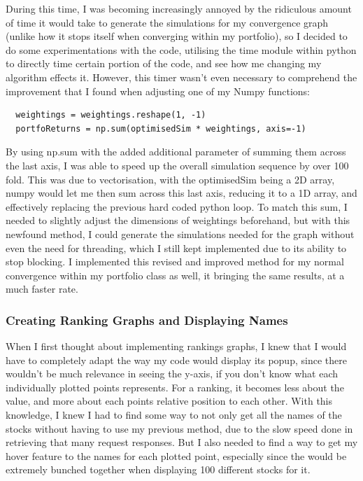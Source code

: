 \documentclass{article}
\begin{document}
During this time, I was becoming increasingly annoyed by the ridiculous amount of time it would take to generate the simulations for my convergence graph (unlike how it stops itself when converging within my portfolio), so I decided to do some experimentations with the code, utilising the time module within python to directly time certain portion of the code, and see how me changing my algorithm effects it. However, this timer wasn't even necessary to comprehend the improvement that I found when adjusting one of my Numpy functions:\\\vspace{0.3cm}

\begin{verbatim}
  weightings = weightings.reshape(1, -1)
  portfoReturns = np.sum(optimisedSim * weightings, axis=-1)
\end{verbatim}

\vspace{0.3cm}
By using np.sum with the added additional parameter of summing them across the last axis, I was able to speed up the overall simulation sequence by over 100 fold. This was due to vectorisation, with the optimisedSim being a 2D array, numpy would let me then sum across this last axis, reducing it to a 1D array, and effectively replacing the previous hard coded python loop. To match this sum, I needed to slightly adjust the dimensions of weightings beforehand, but with this newfound method, I could generate the simulations needed for the graph without even the need for threading, which I still kept implemented due to its ability to stop blocking. I implemented this revised and improved method for my normal convergence within my portfolio class as well, it bringing the same results, at a much faster rate.\\\vspace{0.3cm}

\subsubsection{Creating Ranking Graphs and Displaying Names}
When I first thought about implementing rankings graphs, I knew that I would have to completely adapt the way my code would display its popup, since there wouldn't be much relevance in seeing the y-axis, if you don't know what each individually plotted points represents. For a ranking, it becomes less about the value, and more about each points relative position to each other. With this knowledge, I knew I had to find some way to not only get all the names of the stocks without having to use my previous method, due to the slow speed done in retrieving that many request responses. But I also needed to find a way to get my hover feature to the names for each plotted point, especially since the would be extremely bunched together when displaying 100 different stocks for it.\\\vspace{0.3cm}
\end{document}
